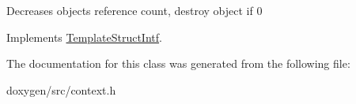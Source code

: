 Decreases object\textquotesingle{}s reference count, destroy object if 0 

Implements \mbox{\hyperlink{class_template_struct_intf_a3dce7dd29d3f66a8080b40578e8a5045}{Template\+Struct\+Intf}}.



The documentation for this class was generated from the following file\+:\begin{DoxyCompactItemize}
\item 
doxygen/src/context.\+h\end{DoxyCompactItemize}

